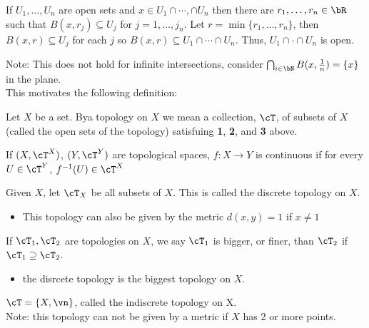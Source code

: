 \begin{pf}[of (3)]
    If $U_1, \ldots, U_n$ are open sets and $x \in U_1 \cap \cdots, \cap U_n$ then there are $r_1, \ldots, r_n \in \bR$ such that $B(x, r_j) \subseteq U_j$ for $j=1, \ldots, j_n$. Let $r = \min \{ r_1, \ldots, r_n \}$, then $B(x, r) \subseteq U_j$ for each $j$ so $B(x,r)\subseteq U_1 \cap \cdots \cap U_n$. Thus, $U_1 \cap \cdot \cap U_n$ is open. 
\end{pf}

\noindent
Note: This does not hold for infinite intersections, consider $\bigcap_{i \in \bN} B(x, \frac{1}{n}) = \{x\}$ in the plane. \\

\noindent
This motivates the following definition: 
\begin{definition}
    Let $X$ be a set. Bya  topology on $X$ we mean a collection, $\cT$, of subsets of $X$ (called the open sets of the topology) satisfuing \textbf{1}, \textbf{2}, and \textbf{3} above. 
\end{definition}

\begin{definition}
    If $(X, \cT^X)$, $(Y, \cT^Y)$ are topological spaces, $f: X \to Y$ is continuous if for every $U \in \cT^Y$, $f^{-1}(U) \in \cT^X$
\end{definition}

\begin{example}
    Given $X$, let $\cT_X$ be all subsets of $X$. This is called the discrete topology on $X$. 
    \begin{itemize}
        \item This topology can also be given by the metric $d(x,y)=1$ if $x \neq 1$
    \end{itemize}
\end{example}

\begin{definition}
    If $\cT_1, \cT_2$ are topologies on $X$, we say $\cT_1$ is bigger, or finer, than $\cT_2$ if $\cT_1 \supseteq \cT_2$.
\end{definition}

\begin{itemize}
    \item the disrcete topology is the biggest topology on $X$.
\end{itemize}

\begin{example}
    $\cT = \{X, \vn\}$, called the indiscrete topology on X. \\
    Note: this topology can not be given by a metric if $X$ has 2 or more points. 
\end{example}